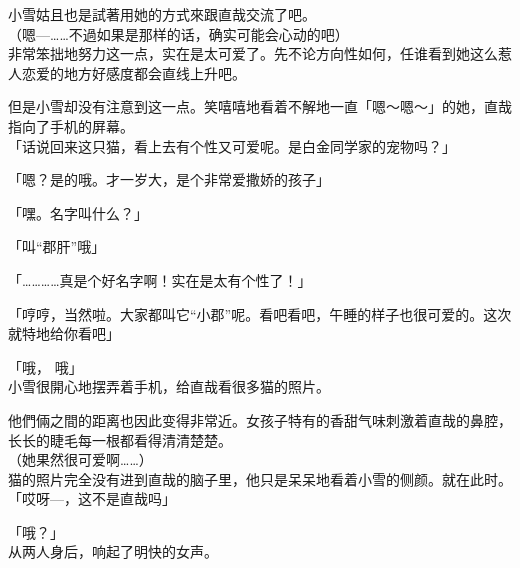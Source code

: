 小雪姑且也是試著用她的方式來跟直哉交流了吧。\\

（嗯—……不過如果是那样的话，确实可能会心动的吧）\\

非常笨拙地努力这一点，实在是太可爱了。先不论方向性如何，任谁看到她这么惹人恋爱的地方好感度都会直线上升吧。

但是小雪却没有注意到这一点。笑嘻嘻地看着不解地一直「嗯～嗯～」的她，直哉指向了手机的屏幕。\\%

「话说回来这只猫，看上去有个性又可爱呢。是白金同学家的宠物吗？」

「嗯？是的哦。才一岁大，是个非常爱撒娇的孩子」

「嘿。名字叫什么？」

「叫“郡肝”哦」

「…………真是个好名字啊！实在是太有个性了！」

「哼哼，当然啦。大家都叫它“小郡”呢。看吧看吧，午睡的样子也很可爱的。这次就特地给你看吧」

「哦， 哦」\\

小雪很開心地摆弄着手机，给直哉看很多猫的照片。

他們倆之間的距离也因此变得非常近。女孩子特有的香甜气味刺激着直哉的鼻腔，长长的睫毛每一根都看得清清楚楚。\\

（她果然很可爱啊……）\\

猫的照片完全没有进到直哉的脑子里，他只是呆呆地看着小雪的侧颜。就在此时。\\

「哎呀—，这不是直哉吗」

「哦？」\\

从两人身后，响起了明快的女声。
